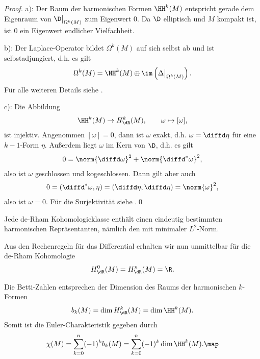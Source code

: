 \documentclass[%
	paper=a5,%
	fleqn,%
	DIV=18,%
	BCOR=0mm,
	fontsize=11pt,
	titlepage=false,%
	bibliography=totoc,
	DIV=18,%
	twoside=true,
	pdftitle=Riemannsche Geometrie,
	pdfauthor=Uwe Semmelmann,
	numbers=noendperiod]%
	{scrbook}
\begin{document}
\begin{proof}
a): Der Raum der harmonischen Formen $\HH^k(M)$ entspricht gerade dem Eigenraum von $\D\big|_{\Omega ^k(M)}$ zum Eigenwert $0$. Da $\D$ elliptisch und $M$ kompakt ist, ist $0$ ein Eigenwert endlicher Vielfachheit.

b): Der Laplace-Operator bildet $\Omega^k(M)$ auf sich selbst ab und ist selbstadjungiert, d.h. es gilt 
\begin{align*}
\Omega^k(M) = \HH^k(M) \oplus \im\left(\Delta\big|_{\Omega^k(M)}\right).
\end{align*}
Für alle weiteren Details siehe \cite{deRham:1984vp}.

c): Die Abbildung
\begin{align*}
\HH^k(M) \to H_{\dR}^k(M),\qquad \omega\mapsto [\omega],
\end{align*}
ist injektiv. Angenommen $[\omega]=0$, dann ist $\omega$ exakt, d.h. $\omega = \diffd\eta$ für eine $k-1$-Form $\eta$. Außerdem liegt $\omega$ im Kern von $\D$, d.h. es gilt
\begin{align*}
0 = \norm{\diffd\omega}^2 + \norm{\diffd^*\omega}^2,
\end{align*}
also ist $\omega$ geschlossen und kogeschlossen. Dann gilt aber auch
\begin{align*}
0 = (\diffd^*\omega,\eta) = (\diffd\eta,\diffd\eta) =\norm{\omega}^2,
\end{align*}
also ist $\omega = 0$. Für die Surjektivität siehe \cite{deRham:1984vp}.\qed
\end{proof}



\begin{rem}[Bemerkungen.]
\begin{remenum}
\item Jede de-Rham Kohomologieklasse enthält einen eindeutig bestimmten harmonischen Repräsentanten, nämlich  den mit minimaler $L^2$-Norm.
\item Aus den Rechenregeln für das Differential erhalten wir nun unmittelbar für die de-Rham Kohomologie
\begin{align*}
H^0_{\dR}(M) = H^n_{\dR}(M) = \R.
\end{align*}
\item Die Betti-Zahlen entsprechen  der Dimension des Raums der harmonischen $k$-Formen
\begin{align*}
b_{k}(M) = \dim H_{\dR}^k(M) = \dim \HH^k(M).
\end{align*}
Somit ist die Euler-Charakteristik gegeben durch
\begin{align*}
\chi(M) = \sum_{k=0}^n (-1)^k b_{k}(M) = \sum_{k=0}^n (-1)^k \dim \HH^k(M).\map
\end{align*}
\end{remenum}
\end{rem}
\end{document}
